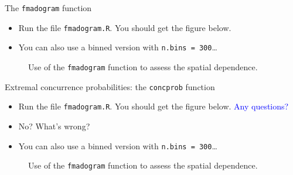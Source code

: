 \message{ !name(showv2.tex)}\documentclass[mode=present,style=simple]{powerdot}
\theoremstyle{plain}%
\theoremstyle{definition}
\theoremstyle{remark}
\newcommand{\advice}[1]{\HandPencilLeft{} \emph{#1}}
\begin{document}
\begin{wideslide}[toc=]{The \texttt{fmadogram} function}
  \vspace{-1.5em}
  \begin{itemize}
  \item Run the file \texttt{fmadogram.R}. You should get the figure
    below.
  \item<2-> You can also use a binned version with \texttt{n.bins =
      300}\ldots
  \end{itemize}
  \begin{figure}
    \centering
    \caption{Use of the \texttt{fmadogram} function to assess the spatial dependence.}
    \label{fig:fmadogram}
  \end{figure}
\end{wideslide}

\begin{wideslide}[toc=]{Extremal concurrence probabilities: the \texttt{concprob} function}
  \begin{itemize}
  \item Run the file \texttt{fmadogram.R}. You should get the figure
    below. \textcolor{blue}{Any questions?}
  \item<2-> No? What's wrong?
  \item<3-> You can also use a binned version with \texttt{n.bins =
      300}\ldots
  \end{itemize}
  \begin{figure}
    \centering
    \caption{Use of the \texttt{fmadogram} function to assess the spatial dependence.}
    \label{fig:fmadogram}
  \end{figure}
\end{wideslide}
\end{document}

